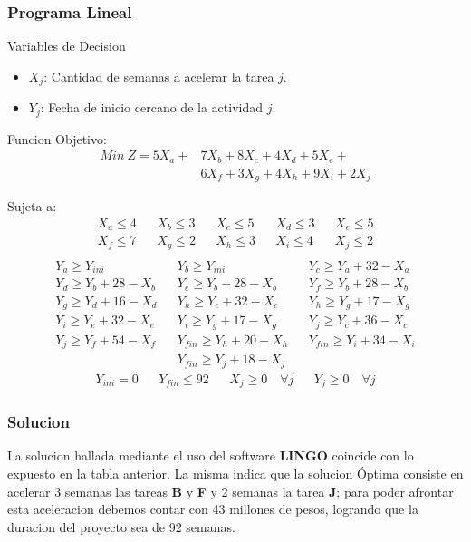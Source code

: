 \begin{homeworkProblem}

\subsubsection{Programa Lineal}
Variables de Decision
\begin{itemize}
    \item $X_j$: Cantidad de semanas a acelerar la tarea $j$.
    \item $Y_j$: Fecha de inicio cercano de la actividad $j$.
\end{itemize}
Funcion Objetivo:
\begin{align*}
    Min\ Z = 5X_a + &7X_b + 8X_c + 4X_d + 5X_e + \\
                    &6X_f + 3X_g + 4X_h + 9X_i + 2X_j
\end{align*}

Sujeta a:
\begin{align*}
    &X_a \leq 4& &X_b \leq 3& &X_c \leq 5& &X_d \leq 3& &X_e \leq 5& \\
    &X_f \leq 7& &X_g \leq 2& &X_h \leq 3& &X_i \leq 4& &X_j\leq 2& \\
\end{align*}
\begin{align*}
   &Y_a \geq Y_{ini}& &Y_b \geq Y_{ini}& &Y_c \geq Y_a + 32 - X_a& \\ 
   &Y_d \geq Y_b + 28 - X_b& &Y_e \geq Y_b + 28 - X_b& &Y_f \geq Y_b + 28 - X_b& \\ 
   &Y_g \geq Y_d + 16 - X_d& &Y_h \geq Y_e + 32 - X_e& &Y_h \geq Y_g + 17 - X_g& \\ 
   &Y_i \geq Y_e + 32 - X_e& &Y_i \geq Y_g+17-X_g& &Y_j \geq Y_c + 36 - X_c&\\
   &Y_j \geq Y_f + 54 - X_f& &Y_{fin} \geq Y_h+20-X_h& &Y_{fin} \geq Y_i+34-X_i&\\
   && &Y_{fin} \geq Y_j+18-X_j& &&
\end{align*}
\begin{align*}
    &Y_{ini}=0& &Y_{fin}\leq92& &X_j\geq0 \quad \forall j& &Y_j\geq 0 \quad \forall j&
\end{align*}

\subsubsection{Solucion}

La solucion hallada mediante el uso del software \textbf{LINGO} coincide con lo expuesto en la tabla anterior. La misma indica que la solucion Óptima consiste en acelerar 3 semanas las tareas \textbf{B} y \textbf{F} y 2 semanas la tarea \textbf{J}; para poder afrontar esta aceleracion debemos contar con 43 millones de pesos, logrando que la duracion del proyecto sea de 92 semanas.


\end{homeworkProblem}
